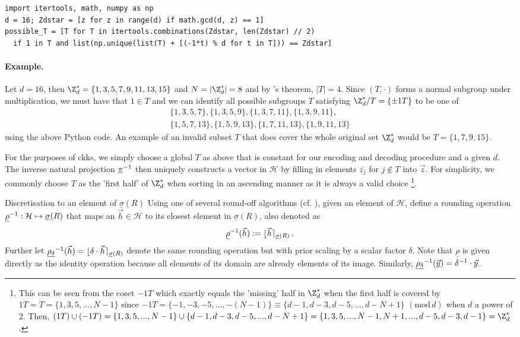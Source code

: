 \begin{verbatim}
import itertools, math, numpy as np
d = 16; Zdstar = [z for z in range(d) if math.gcd(d, z) == 1]
possible_T = [T for T in itertools.combinations(Zdstar, len(Zdstar) // 2)
  if 1 in T and list(np.unique(list(T) + [(-1*t) % d for t in T])) == Zdstar]
\end{verbatim}

\paragraph{Example.}
Let $d = 16$, then $\Z_d^* = \{1, 3, 5, 7, 9, 11, 13, 15\}$ and $N = |\Z_d^*| = 8$ and by 's theorem, $|T| = 4$.
Since $(T, \cdot)$ forms a normal subgroup under multiplication, we must have that $1 \in T$ and we can identify all possible subgroups $T$ satisfying $\Z_d^* / T = \{\pm 1T\}$ to be one of
\begin{align*}
  \{1, 3, 5, 7\},
  \{1, 3, 5, 9\},
  \{1, 3, 7, 11\},
  \{1, 3, 9, 11\}, \\
  \{1, 5, 7, 13\},
  \{1, 5, 9, 13\},
  \{1, 7, 11, 13\},
  \{1, 9, 11, 13\}
\end{align*}
using the above Python code. An example of an invalid subset $T$ that does cover the whole original set $\Z_d^*$ would be $T = \{1, 7, 9, 15\}$.

For the purposes of \gls{ckks}, we simply choose a global $T$ as above that is constant for our encoding and decoding procedure and a given $d$.
The inverse natural projection $\underline{\pi}^{-1}$ then uniquely constructs a vector in $\mathcal{H}$ by filling in elements $\overline{z_j}$ for $j \notin T$ into $\vec{z}$.
For simplicity, we commonly choose $T$ as the 'first half' of $\Z_d^*$ when sorting in an ascending manner as it is always a valid choice
\footnote{
  This can be seen from the coset $-1T$ which exactly equals the 'missing' half in $\Z_d^*$ when the first half is covered by $1T = T = \{1, 3, 5, ..., N-1\}$ since $-1T = \{-1, -3, -5, ..., -(N-1)\} \equiv \{d-1, d-3, d-5, ..., d-N+1\}$ $(\text{mod}\, d)$ when $d$ a power of 2.
  Then, $(1T) \cup (-1T) = \{1, 3, 5, ..., N-1\} \cup \{d-1, d-3, d-5, ..., d-N+1\} = \{1, 3, 5, ..., N-1, N+1, ..., d-5, d-3, d-1\} = \Z_d^*$.
}.

\begin{definition}{Discretisation to an element of $\underline{\sigma}(R)$}{}
  Using one of several round-off algorithms (cf. \cite{2013-rlwe-toolkit}), given an element of $\mathcal{H}$, define a rounding operation $\underline{\rho}^{-1}: \mathcal{H} \mapsto \underline{\sigma}(R)$ that maps an $\vec{h} \in \mathcal{H}$ to its closest element in $\underline{\sigma}(R)$, also denoted as
  $$\underline{\rho}^{-1}(\vec{h}) := \lfloor \vec{h} \rceil_{\underline{\sigma}(R)}\,.$$
  Further let $\underline{\rho_\delta}^{-1}(\vec{h}) = \lfloor \delta \cdot \vec{h} \rceil_{\underline{\sigma}(R)}$ denote the same rounding operation but with prior scaling by a scalar factor $\delta$.
  Note that $\underline{\rho}$ is given directly as the identity operation because all elements of its domain are already elements of its image. Similarly, $\underline{\rho_\delta}^{-1}(\vec{y}) = \delta^{-1} \cdot \vec{y}$.
\end{definition}

